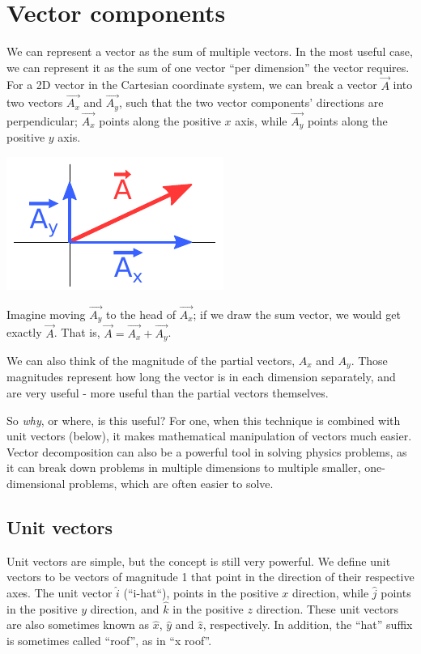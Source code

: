 \documentclass[8.01x]{subfiles}
\begin{document}
\section{Vector components}

We can represent a vector as the sum of multiple vectors. In the most useful case, we can represent it as the sum of one vector ``per dimension'' the vector requires.\\
For a 2D vector in the Cartesian coordinate system, we can break a vector $\vec{A}$ into two vectors $\vec{A_x}$ and $\vec{A_y}$, such that the two vector components' directions are perpendicular; $\vec{A_x}$ points along the positive $x$ axis, while $\vec{A_y}$ points along the positive $y$ axis.

\includegraphics[scale=1.0]{Graphics/vectors/vectorcomponents}

Imagine moving $\vec{A_y}$ to the head of $\vec{A_x}$; if we draw the sum vector, we would get exactly $\vec{A}$. That is, $\vec{A} = \vec{A_x} + \vec{A_y}$.

We can also think of the magnitude of the partial vectors, $A_x$ and $A_y$. Those magnitudes represent how long the vector is in each dimension separately, and are very useful - more useful than the partial vectors themselves.

So \emph{why}, or where, is this useful? For one, when this technique is combined with unit vectors (below), it makes mathematical manipulation of vectors much easier. Vector decomposition can also be a powerful tool in solving physics problems, as it can break down problems in multiple dimensions to multiple smaller, one-dimensional problems, which are often easier to solve.


\subsection{Unit vectors}
Unit vectors are simple, but the concept is still very powerful. We define unit vectors to be vectors of magnitude 1 that point in the direction of their respective axes. The unit vector $\hat{i}$ (``i-hat``), points in the positive $x$ direction, while $\hat{j}$ points in the positive $y$ direction, and $\hat{k}$ in the positive $z$ direction. These unit vectors are also sometimes known as $\hat{x}$, $\hat{y}$ and $\hat{z}$, respectively. In addition, the ``hat'' suffix is sometimes called ``roof'', as in ``x roof''.
\end{document}
